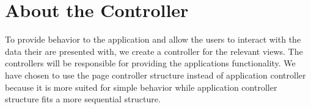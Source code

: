 \section{About the Controller}
To provide behavior to the application and allow the users to interact with the data their are presented with, we create a controller for the relevant views. The controllers will be responsible for providing the applications functionality. We have chosen to use the page controller structure instead of application controller because it is more suited for simple behavior while application controller structure fits a more sequential structure.